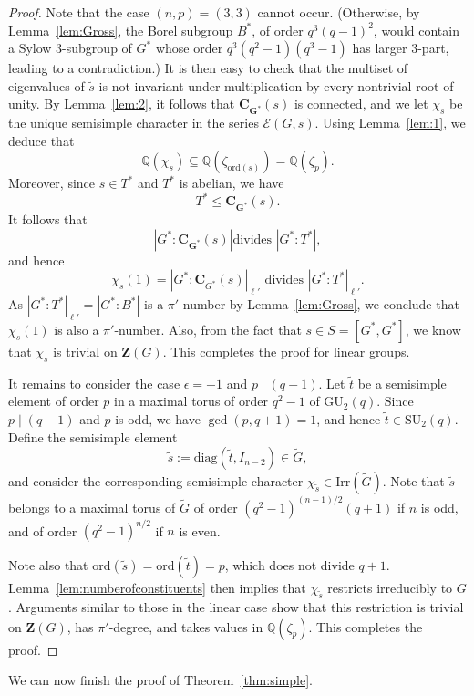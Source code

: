 \documentclass[12pt]{amsart}
\theoremstyle{definition}
\numberwithin{equation}{section}
\newcommand{\GU}{{\mathrm {GU}}}
\newcommand{\SU}{{\mathrm {SU}}}
\newcommand{\Irr}{{\mathrm {Irr}}}
\newcommand{\ord}{{\mathrm {ord}}}
\newcommand{\diag}{{\mathrm {diag}}}
\newcommand{\QQ}{{\mathbb Q}}
\newcommand{\EC}{\mathcal{E}}
\newcommand{\bC}{{\mathbf{C}}}
\newcommand{\bG}{{\mathbf{G}}}
\newcommand{\bZ}{{\mathbf{Z}}}
\begin{document}
\begin{proof}
Note that the case $(n,p)=(3,3)$ cannot occur. (Otherwise, by
Lemma~\ref{lem:Gross}, the Borel subgroup $B^*$, of order
$q^3(q-1)^2$, would contain a Sylow $3$-subgroup of $G^*$ whose
order $q^3(q^2-1)(q^3-1)$ has larger $3$-part, leading to a
contradiction.) It is then easy to check that the multiset of
eigenvalues of $\widetilde{s}$ is not invariant under multiplication
by every nontrivial root of unity. By Lemma~\ref{lem:2}, it follows
that $\bC_{\bG^*}(s)$ is connected, and we let $\chi_s$ be the
unique semisimple character in the series $\EC(G,s)$. Using
Lemma~\ref{lem:1}, we deduce that
\[\QQ(\chi_{s})\subseteq\QQ(\zeta_{\ord(s)})=\QQ(\zeta_p).\] Moreover,
since $s\in T^*$ and $T^*$ is abelian, we have \[T^*\le
\bC_{\bG^*}(s).\] It follows that \[|G^*:\bC_{\bG^*}(s)| \text{
divides } |G^*:T^*|,\] and hence
\[
\chi_s(1)=|G^*:\bC_{G^*}(s)|_{\ell'} \text{ divides }
|G^*:T^*|_{\ell'}.
\]
As $|G^*:T^*|_{\ell'}=|G^*:B^*|$ is a $\pi'$-number by
Lemma~\ref{lem:Gross}, we conclude that $\chi_s(1)$ is also a
$\pi'$-number. Also, from the fact that $s\in S=[G^*,G^*]$, we know
that $\chi_{s}$ is trivial on $\bZ({G})$. This completes the proof
for linear groups.


It remains to consider the case $\epsilon=-1$ and $p \mid (q-1)$.
Let \(\widetilde{t}\) be a semisimple element of order \(p\) in a
maximal torus of order $q^2-1$ of \(\GU_2(q)\). Since \(p \mid
(q-1)\) and \(p\) is odd, we have \(\gcd(p,q+1)=1\), and hence
\(\widetilde{t}\in \SU_2(q)\). Define the semisimple element
\[
\widetilde{s}:=\diag\left(\widetilde{t}, I_{n-2}\right)\in
\widetilde{G},
\]
and consider the corresponding semisimple character
\(\chi_{\widetilde{s}}\in \Irr(\widetilde{G})\). Note that
$\widetilde{s}$ belongs to a maximal torus of $\widetilde{G}$ of
order $(q^2-1)^{(n-1)/2}(q+1)$ if $n$ is odd, and of order
$(q^2-1)^{n/2}$ if $n$ is even.

Note also that \(\ord(\widetilde{s})=\ord(\widetilde{t})=p\), which
does not divide $q+1$. Lemma~\ref{lem:numberofconstituents} then
implies that \(\chi_{\widetilde{s}}\) restricts irreducibly to
\(G\). Arguments similar to those in the linear case show that this
restriction is trivial on \(\bZ(G)\), has \(\pi'\)-degree, and takes
values in \(\QQ(\zeta_p)\). This completes the proof.
\end{proof}


We can now finish the proof of Theorem~\ref{thm:simple}.
\end{document}
